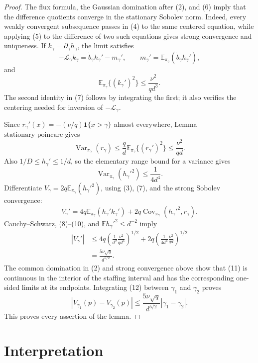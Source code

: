 \documentclass{article}
\begin{document}
\begin{proof}
The flux formula, the Gaussian domination after (2), and (6) imply that the difference quotients converge in the stationary Sobolev norm.  Indeed, every weakly convergent subsequence passes in (4) to the same centered equation, while applying (5) to the difference of two such equations gives strong convergence and uniqueness.  If \(k_\gamma=\partial_\gamma h_\gamma\), the limit satisfies
\[
 -\mathcal L_\gamma k_\gamma
 =\dot b_\gamma h_\gamma'-m_\gamma',
 \qquad
 m_\gamma'=\mathbb E_{\pi_\gamma}(\dot b_\gamma h_\gamma'), \tag{7}
\]
and
\[
 \mathbb E_{\pi_\gamma}\{(k_\gamma')^2\}
 \leq\frac{\nu^2}{qd^3}.                                     \tag{8}
\]
The second identity in (7) follows by integrating the first; it also verifies the centering needed for inversion of \(-\mathcal L_\gamma\).

Since \(r_\gamma'(x)=-(\nu/q)\mathbf1\{x>\gamma\}\) almost everywhere, Lemma \(\mathrm{stationary\mbox{-}poincare}\) gives
\[
 \operatorname{Var}_{\pi_\gamma}(r_\gamma)
 \leq\frac qd\mathbb E_{\pi_\gamma}\{(r_\gamma')^2\}
 \leq\frac{\nu^2}{qd}.                                       \tag{9}
\]
Also \(1/D\leq h_\gamma'\leq1/d\), so the elementary range bound for a variance gives
\[
 \operatorname{Var}_{\pi_\gamma}(h_\gamma'^2)
 \leq\frac1{4d^4}.                                            \tag{10}
\]
Differentiate \(V_\gamma=2q\mathbb E_{\pi_\gamma}(h_\gamma'^2)\), using (3), (7), and the strong Sobolev convergence:
\[
 V_\gamma'
 =4q\mathbb E_{\pi_\gamma}(h_\gamma'k_\gamma')
 +2q\operatorname{Cov}_{\pi_\gamma}(h_\gamma'^2,r_\gamma). \tag{11}
\]
Cauchy--Schwarz, (8)--(10), and \(\mathbb E h_\gamma'^2\leq d^{-2}\) imply
\[
 \begin{split}
 |V_\gamma'|
 &\leq4q\left(\frac1{d^2}\frac{\nu^2}{qd^3}\right)^{1/2}
 +2q\left(\frac1{4d^4}\frac{\nu^2}{qd}\right)^{1/2}\\
 &=\frac{5\nu\sqrt q}{d^{5/2}}.                              \tag{12}
 \end{split}
\]
The common domination in (2) and strong convergence above show that (11) is continuous in the interior of the staffing interval and has the corresponding one-sided limits at its endpoints.  Integrating (12) between \(\gamma_1\) and \(\gamma_2\) proves
\[
 |V_{\gamma_1}(p)-V_{\gamma_2}(p)|
 \leq\frac{5\nu\sqrt q}{d^{5/2}}|\gamma_1-\gamma_2|.
\]
This proves every assertion of the lemma.
\end{proof}

\section{Interpretation}
\end{document}
